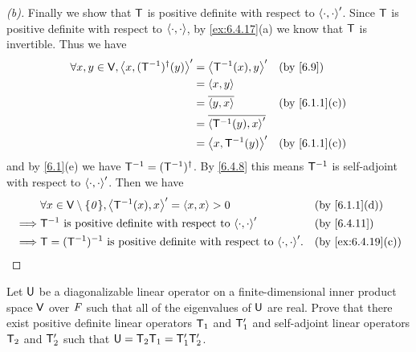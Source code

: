\begin{proof}[(b)]
	Finally we show that \(\mathsf{T}\) is positive definite with respect to \(\left\langle\cdot, \cdot\right\rangle'\).
	Since \(\mathsf{T}\) is positive definite with respect to \(\left\langle\cdot, \cdot\right\rangle\), by \cref{ex:6.4.17}(a) we know that \(\mathsf{T}\) is invertible.
	Thus we have
	\begin{align*}
		\forall x, y \in \V, \inn{x, (\T^{-1})^{\dag}(y)}' & = \inn{\T^{-1}(x), y}'        &  & \by{6.9}      \\
		                                                   & = \inn{x, y}                                     \\
		                                                   & = \conj{\inn{y, x}}           &  & \by{6.1.1}[c] \\
		                                                   & = \conj{\inn{\T^{-1}(y), x}'}                    \\
		                                                   & = \inn{x, \T^{-1}(y)}'        &  & \by{6.1.1}[c]
	\end{align*}
	and by \cref{6.1}(e) we have \(\mathsf{T}^{-1} = (\mathsf{T}^{-1})^{\dag}\).
	By \cref{6.4.8} this means \(\mathsf{T}^{-1}\) is self-adjoint with respect to \(\left\langle\cdot, \cdot\right\rangle'\).
	Then we have
	\begin{align*}
		         & \forall x \in \V \setminus \set{\zv}, \inn{\T^{-1}(x), x}' = \inn{x, x} > 0            &  & \by{6.1.1}[d]     \\
		\implies & \T^{-1} \text{ is positive definite with respect to } \inn{\cdot, \cdot}'              &  & \by{6.4.11}       \\
		\implies & \T = (\T^{-1})^{-1} \text{ is positive definite with respect to } \inn{\cdot, \cdot}'. &  & \by{ex:6.4.19}[c]
	\end{align*}
\end{proof}

\begin{ex}\label{ex:6.4.23}
	Let \(\mathsf{U}\) be a diagonalizable linear operator on a finite-dimensional inner product space \(\mathsf{V}\) over \(\mathit{F}\) such that all of the eigenvalues of \(\mathsf{U}\) are real.
	Prove that there exist positive definite linear operators \(\mathsf{T}_1\) and \(\mathsf{T}_1'\) and self-adjoint linear operators \(\mathsf{T}_2\) and \(\mathsf{T}_2'\) such that \(\mathsf{U} = \mathsf{T}_2 \mathsf{T}_1 = \mathsf{T}_1' \mathsf{T}_2'\).
\end{ex}

